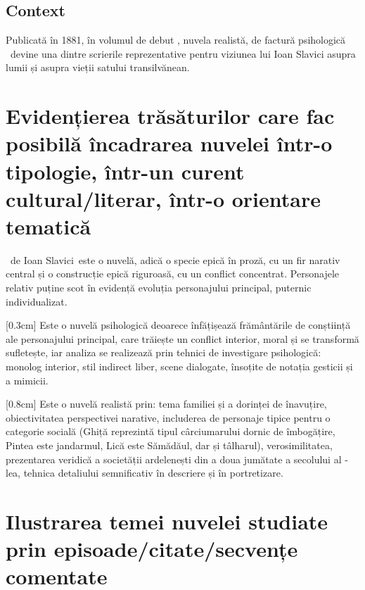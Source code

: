 \renewcommand{\operatitle}{\textbfit{„Moara cu noroc”}} %
\renewcommand{\operaauthor}{Ioan Slavici} %


\subsection{Context}

Publicată în 1881, în volumul de debut , nuvela realistă, de factură psihologică \operatitle\ devine una dintre scrierile reprezentative pentru viziunea lui Ioan Slavici asupra lumii și asupra vieții satului transilvănean.


\section{Evidențierea trăsăturilor care fac posibilă încadrarea nuvelei într-o tipologie, într-un curent cultural/literar, într-o orientare tematică}

\operatitle\ de \operaauthor\ este o nuvelă, adică o specie epică în proză, cu un fir narativ central și o construcție epică riguroasă, cu un conflict concentrat. Personajele relativ puține scot în evidență evoluția personajului principal, puternic individualizat.

[0.3cm]
Este o nuvelă psihologică deoarece înfățișează frământările de conștiință ale personajului principal, care trăiește un conflict interior, moral și se transformă sufletește, iar analiza se realizează prin tehnici de investigare psihologică: monolog interior, stil indirect liber, scene dialogate, însoțite de notația gesticii și a mimicii.

[0.8cm]
Este o nuvelă realistă prin: tema familiei și a dorinței de înavuțire, obiectivitatea perspectivei narative, includerea de personaje tipice pentru o categorie socială (Ghiță reprezintă tipul cârciumarului dornic de îmbogățire, Pintea este jandarmul, Lică este Sămădăul, dar și tâlharul), verosimilitatea, prezentarea veridică a societății ardelenești din a doua jumătate a secolului al -lea, tehnica detaliului semnificativ în descriere și în portretizare.


\section{Ilustrarea temei nuvelei studiate prin episoade/citate/sec\-ven\-țe comentate}

